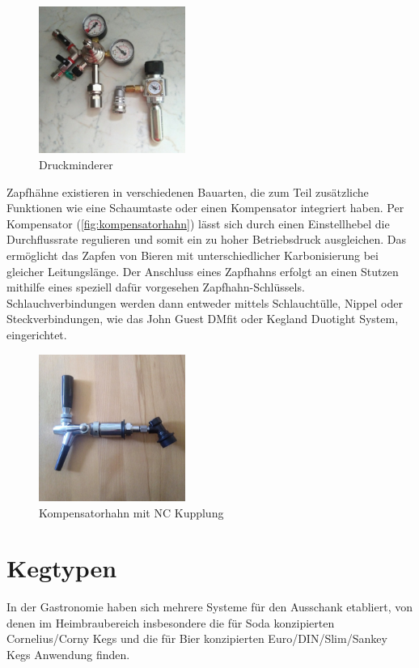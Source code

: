 \documentclass[a4paper,parskip=half]{scrartcl}
\begin{document}
\begin{figure}[h]
\centering
\includegraphics[width=4.8cm]{images/druckminderer.jpg}
\caption{Druckminderer}
\label{fig:druckminderer}
\end{figure}

Zapfhähne existieren in verschiedenen Bauarten, die zum Teil zusätzliche Funktionen wie eine Schaumtaste oder einen Kompensator integriert haben. Per Kompensator (\autoref{fig:kompensatorhahn}) lässt sich durch einen Einstellhebel die Durchflussrate regulieren und somit ein zu hoher Betriebsdruck ausgleichen. Das ermöglicht das Zapfen von Bieren mit unterschiedlicher Karbonisierung bei gleicher Leitungslänge. Der Anschluss eines Zapfhahns erfolgt an einen Stutzen mithilfe eines speziell dafür vorgesehen Zapfhahn-Schlüssels. Schlauchverbindungen werden dann entweder mittels Schlauchtülle, Nippel oder Steckverbindungen, wie das John Guest DMfit oder Kegland Duotight System, eingerichtet.

\begin{figure}[h]
\centering
\includegraphics[width=4.8cm]{images/kompensatorhahn.jpg}
\caption{Kompensatorhahn mit NC Kupplung}
\label{fig:kompensatorhahn}
\end{figure}

\section*{Kegtypen}

In der Gastronomie haben sich mehrere Systeme \autocite{HWBS2021} für den Ausschank etabliert, von denen im Heimbraubereich insbesondere die für Soda konzipierten Cornelius/Corny Kegs und die für Bier konzipierten Euro/DIN/Slim/Sankey Kegs Anwendung finden.
\end{document}
